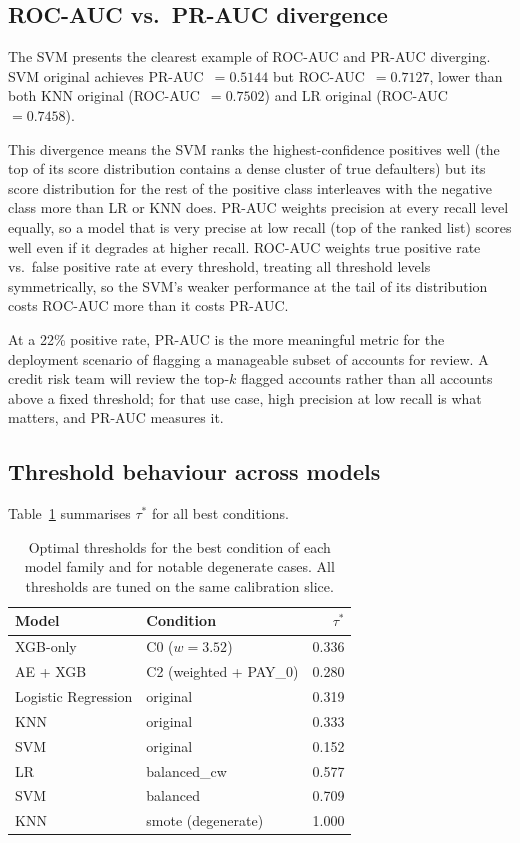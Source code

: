 \documentclass[12pt,a4paper]{article}
\begin{document}
\subsection{ROC-AUC vs.\ PR-AUC divergence}

The SVM presents the clearest example of ROC-AUC and PR-AUC diverging.
SVM original achieves PR-AUC~$= 0.5144$ but ROC-AUC~$= 0.7127$, lower than
both KNN original (ROC-AUC~$= 0.7502$) and LR original (ROC-AUC~$= 0.7458$).

This divergence means the SVM ranks the highest-confidence positives well
(the top of its score distribution contains a dense cluster of true defaulters)
but its score distribution for the rest of the positive class interleaves with
the negative class more than LR or KNN does. PR-AUC weights precision at
every recall level equally, so a model that is very precise at low recall
(top of the ranked list) scores well even if it degrades at higher recall.
ROC-AUC weights true positive rate vs.\ false positive rate at every threshold,
treating all threshold levels symmetrically, so the SVM's weaker performance
at the tail of its distribution costs ROC-AUC more than it costs PR-AUC.

At a 22\% positive rate, PR-AUC is the more meaningful metric for the
deployment scenario of flagging a manageable subset of accounts for review.
A credit risk team will review the top-$k$ flagged accounts rather than
all accounts above a fixed threshold; for that use case, high precision at
low recall is what matters, and PR-AUC measures it.

\subsection{Threshold behaviour across models}

Table~\ref{tab:thresholds} summarises $\tau^*$ for all best conditions.

\begin{table}[H]
\centering
\caption{Optimal thresholds for the best condition of each model family and
         for notable degenerate cases. All thresholds are tuned on the same
         calibration slice.}
\label{tab:thresholds}
\small
\begin{tabular}{llr}
\toprule
Model & Condition & $\tau^*$ \\
\midrule
XGB-only & C0 ($w=3.52$) & 0.336 \\
AE + XGB & C2 (weighted + PAY\_0) & 0.280 \\
Logistic Regression & original & 0.319 \\
KNN & original & 0.333 \\
SVM & original & 0.152 \\
\midrule
LR & balanced\_cw & 0.577 \\
SVM & balanced & 0.709 \\
KNN & smote (degenerate) & 1.000 \\
\bottomrule
\end{tabular}
\end{table}
\end{document}
